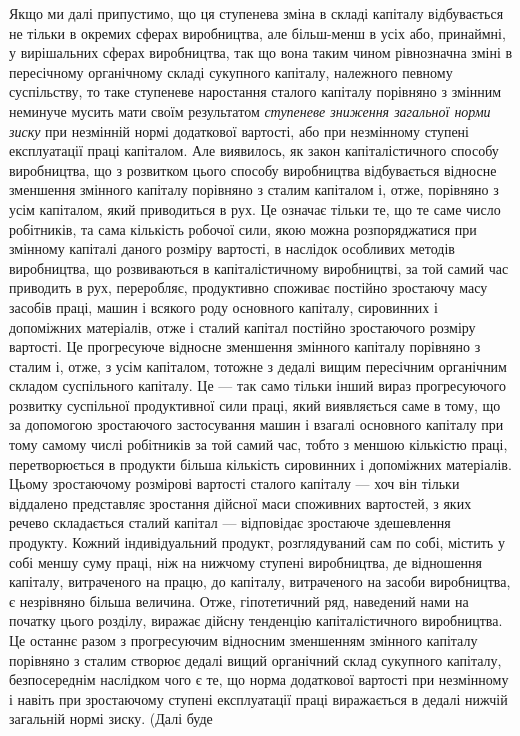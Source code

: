 Якщо ми далі припустимо, що ця ступенева зміна в складі
капіталу відбувається не тільки в окремих сферах виробництва,
але більш-менш в усіх або, принаймні, у вирішальних сферах
виробництва, так що вона таким чином рівнозначна зміні в пересічному
органічному складі сукупного капіталу, належного певному
суспільству, то таке ступеневе наростання сталого капіталу
порівняно з змінним неминуче мусить мати своїм результатом
\emph{ступеневе зниження загальної норми зиску} при незмінній нормі
додаткової вартості, або при незмінному ступені експлуатації
праці капіталом. Але виявилось, як закон капіталістичного способу
виробництва, що з розвитком цього способу виробництва
відбувається відносне зменшення змінного капіталу порівняно
з сталим капіталом і, отже, порівняно з усім капіталом, який
приводиться в рух. Це означає тільки те, що те саме число
робітників, та сама кількість робочої сили, якою можна розпоряджатися
при змінному капіталі даного розміру вартості, в наслідок
особливих методів виробництва, що розвиваються в капіталістичному
виробництві, за той самий час приводить в рух,
переробляє, продуктивно споживає постійно зростаючу масу
засобів праці, машин і всякого роду основного капіталу, сировинних
і допоміжних матеріалів, отже і сталий капітал постійно
зростаючого розміру вартості. Це прогресуюче відносне зменшення
змінного капіталу порівняно з сталим і, отже, з усім капіталом,
тотожне з дедалі вищим пересічним органічним складом
суспільного капіталу. Це — так само тільки інший вираз
прогресуючого розвитку суспільної продуктивної сили праці,
який виявляється саме в тому, що за допомогою зростаючого
застосування машин і взагалі основного капіталу при тому самому
числі робітників за той самий час, тобто з меншою кількістю
праці, перетворюється в продукти більша кількість сировинних
і допоміжних матеріалів. Цьому зростаючому розмірові вартості
сталого капіталу — хоч він тільки віддалено представляє зростання
дійсної маси споживних вартостей, з яких речево складається
сталий капітал — відповідає зростаюче здешевлення продукту.
Кожний індивідуальний продукт, розглядуваний сам по
собі, містить у собі меншу суму праці, ніж на нижчому ступені виробництва,
де відношення капіталу, витраченого на працю, до
капіталу, витраченого на засоби виробництва, є незрівняно
більша величина. Отже, гіпотетичний ряд, наведений нами на
початку цього розділу, виражає дійсну тенденцію капіталістичного
виробництва. Це останнє разом з прогресуючим відносним
зменшенням змінного капіталу порівняно з сталим створює дедалі
вищий органічний склад сукупного капіталу, безпосереднім
наслідком чого є те, що норма додаткової вартості при незмінному
і навіть при зростаючому ступені експлуатації праці
виражається в дедалі нижчій загальній нормі зиску. (Далі буде
\parbreak{}  %
